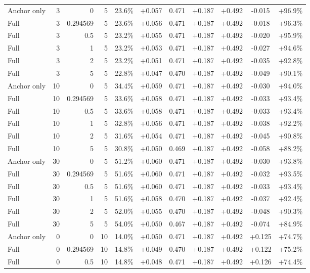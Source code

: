 \begin{table}[htbp]
\begin{tabular}{lrrrccccccc}
Anchor only & 3 & 0 & 5 & 23.6\% & +0.057 & 0.471 & +0.187 & +0.492 & -0.015 & +96.9\% \\
Full & 3 & 0.294569 & 5 & 23.6\% & +0.056 & 0.471 & +0.187 & +0.492 & -0.018 & +96.3\% \\
Full & 3 & 0.5 & 5 & 23.2\% & +0.055 & 0.471 & +0.187 & +0.492 & -0.020 & +95.9\% \\
Full & 3 & 1 & 5 & 23.2\% & +0.053 & 0.471 & +0.187 & +0.492 & -0.027 & +94.6\% \\
Full & 3 & 2 & 5 & 23.2\% & +0.051 & 0.471 & +0.187 & +0.492 & -0.035 & +92.8\% \\
Full & 3 & 5 & 5 & 22.8\% & +0.047 & 0.470 & +0.187 & +0.492 & -0.049 & +90.1\% \\
Anchor only & 10 & 0 & 5 & 34.4\% & +0.059 & 0.471 & +0.187 & +0.492 & -0.030 & +94.0\% \\
Full & 10 & 0.294569 & 5 & 33.6\% & +0.058 & 0.471 & +0.187 & +0.492 & -0.033 & +93.4\% \\
Full & 10 & 0.5 & 5 & 33.6\% & +0.058 & 0.471 & +0.187 & +0.492 & -0.033 & +93.4\% \\
Full & 10 & 1 & 5 & 32.8\% & +0.056 & 0.471 & +0.187 & +0.492 & -0.038 & +92.2\% \\
Full & 10 & 2 & 5 & 31.6\% & +0.054 & 0.471 & +0.187 & +0.492 & -0.045 & +90.8\% \\
Full & 10 & 5 & 5 & 30.8\% & +0.050 & 0.469 & +0.187 & +0.492 & -0.058 & +88.2\% \\
Anchor only & 30 & 0 & 5 & 51.2\% & +0.060 & 0.471 & +0.187 & +0.492 & -0.030 & +93.8\% \\
Full & 30 & 0.294569 & 5 & 51.6\% & +0.060 & 0.471 & +0.187 & +0.492 & -0.032 & +93.5\% \\
Full & 30 & 0.5 & 5 & 51.6\% & +0.060 & 0.471 & +0.187 & +0.492 & -0.033 & +93.4\% \\
Full & 30 & 1 & 5 & 51.6\% & +0.058 & 0.470 & +0.187 & +0.492 & -0.037 & +92.4\% \\
Full & 30 & 2 & 5 & 52.0\% & +0.055 & 0.470 & +0.187 & +0.492 & -0.048 & +90.3\% \\
Full & 30 & 5 & 5 & 54.0\% & +0.050 & 0.467 & +0.187 & +0.492 & -0.074 & +84.9\% \\
Anchor only & 0 & 0 & 10 & 14.0\% & +0.050 & 0.471 & +0.187 & +0.492 & +0.125 & +74.7\% \\
Full & 0 & 0.294569 & 10 & 14.8\% & +0.049 & 0.470 & +0.187 & +0.492 & +0.122 & +75.2\% \\
Full & 0 & 0.5 & 10 & 14.8\% & +0.048 & 0.471 & +0.187 & +0.492 & +0.126 & +74.4\% \\

\end{tabular}
\end{table}
